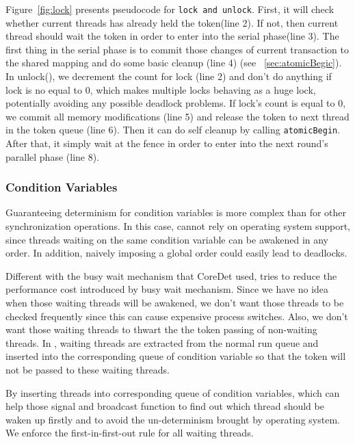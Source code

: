 \label{sec:lock}
Figure~\ref{fig:lock} presents pseudocode for \texttt{lock and unlock}.
First, it will check whether current threads has already held the token(line 2). 
If not, then current thread should wait the token in order to enter into 
the serial phase(line 3). The first thing in the serial phase is to
commit those changes of current transaction to the shared mapping and 
do some basic cleanup (line 4) (see ~\ref{sec:atomicBegic}).
In unlock(), we decrement the count for lock (line 2) and don't do anything if
lock is no equal to 0, which makes multiple locks behaving as a huge lock, potentially 
avoiding any possible deadlock problems.
If lock's count is equal to 0, we commit all memory modifications (line 5) and release
the token to next thread in the token queue (line 6). Then it can do self cleanup by calling
\texttt{atomicBegin}. After that, it simply wait at the fence in order to enter into the next
round's parallel phase (line 8).

\subsubsection{Condition Variables}

Guaranteeing determinism for condition variables is more complex than
for other synchronization operations. In this case, \dthreads{} cannot
rely on operating system support, since threads waiting on the same
condition variable can be awakened in any order. In addition, naively
imposing a global order could easily lead to deadlocks.

\label{sec:condwait}
Different with the busy wait mechanism that CoreDet used, 
\dthreads{} tries to reduce the performance cost
introduced by busy wait mechanism. Since we have no idea when those
waiting threads will be awakened, we don't want those threads to be
checked frequently since this can cause expensive process
switches. Also, we don't want those waiting threads to thwart the the
token passing of non-waiting threads.
In \dthreads{}, waiting threads are extracted from the normal run
queue and inserted into the corresponding queue of condition
variable so that the token will not be passed to these waiting
threads.

By inserting threads into corresponding queue of condition
variables, which can help those signal and broadcast function to find
out which thread should be waken up firstly and to avoid the
un-determinism brought by operating system. We enforce the
first-in-first-out rule for all waiting threads.

